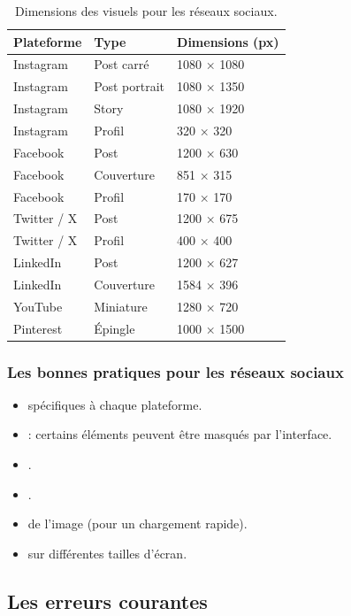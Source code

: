 \begin{table}[h!]
\centering
\begin{tabular}{@{}lll@{}}
\toprule
\textbf{Plateforme} & \textbf{Type} & \textbf{Dimensions (px)} \\
\midrule
Instagram & Post carré & 1080 × 1080 \\
Instagram & Post portrait & 1080 × 1350 \\
Instagram & Story & 1080 × 1920 \\
Instagram & Profil & 320 × 320 \\
Facebook & Post & 1200 × 630 \\
Facebook & Couverture & 851 × 315 \\
Facebook & Profil & 170 × 170 \\
Twitter / X & Post & 1200 × 675 \\
Twitter / X & Profil & 400 × 400 \\
LinkedIn & Post & 1200 × 627 \\
LinkedIn & Couverture & 1584 × 396 \\
YouTube & Miniature & 1280 × 720 \\
Pinterest & Épingle & 1000 × 1500 \\
\bottomrule
\end{tabular}
\caption{Dimensions des visuels pour les réseaux sociaux.}
\end{table}

\subsubsection{Les bonnes pratiques pour les réseaux sociaux}

\begin{itemize}
    \item {} spécifiques à chaque plateforme.
    \item {} : certains éléments peuvent être masqués par l'interface.
    \item {}.
    \item {}.
    \item {} de l'image (pour un chargement rapide).
    \item {} sur différentes tailles d'écran.
\end{itemize}

\subsection{Les erreurs courantes}


